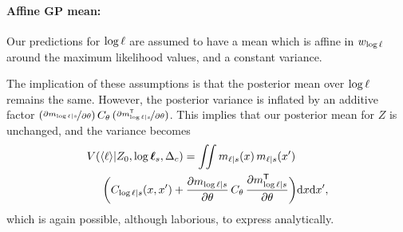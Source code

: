 \documentclass{article}
\begin{document}
\paragraph*{Affine GP mean:} Our predictions for $\tr$ are assumed to have a \gpb mean which is affine in $w_\tr$ around the maximum likelihood values, and a constant variance.  

 
The implication of these assumptions is that the posterior mean over $\tr$ remains the same. However, the posterior variance is inflated by an additive factor
$
(\npderiv{m_{\tr|s}}{\theta})\,C_\theta\,(\npderiv{m\tra_{\tr|s}}{\theta})
$. 
This implies that our posterior mean for $Z$ is unchanged, and the variance becomes
\begin{align*}
  &\cov{\inty{\lfn}}{Z_0,\tvr_s,\Delta_c}=
 \iint m_{\lfn|s}(\lfv)\, m_{\lfn|s}(\lfv')\\
&  
\hspace{0.5cm}\biggl(C_{\tr|s}(\lfv,\lfv') + \pderiv{m_{\tr|s}}{\theta}\,C_\theta\,\pderiv{m\tra_{\tr|s}}{\theta}\biggr)
 \ud \lfv \ud\lfv',
\end{align*}
which is again possible, although laborious, to express analytically.
\end{document}
